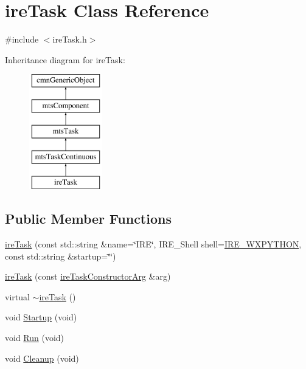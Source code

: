 \hypertarget{classire_task}{\section{ire\-Task Class Reference}
\label{classire_task}
}


{\ttfamily \#include $<$ire\-Task.\-h$>$}

Inheritance diagram for ire\-Task\-:\begin{figure}[H]
\begin{center}
\leavevmode
\includegraphics[height=5.000000cm]{d7/dd4/classire_task}
\end{center}
\end{figure}
\subsection*{Public Member Functions}
\begin{DoxyCompactItemize}
\item 
\hyperlink{classire_task_ade2dbb844ec030116011fef2d691fdd9}{ire\-Task} (const std\-::string \&name=\char`\"{}I\-R\-E\char`\"{}, I\-R\-E\-\_\-\-Shell shell=\hyperlink{ire_task_8h_acf351b6707399f614eed953a7c0c0d9aa659bffb40eea456bffe6e139d3d15477}{I\-R\-E\-\_\-\-W\-X\-P\-Y\-T\-H\-O\-N}, const std\-::string \&startup=\char`\"{}\char`\"{})
\item 
\hyperlink{classire_task_a94437d6aa990db9b83e6741939fbdeee}{ire\-Task} (const \hyperlink{classire_task_constructor_arg}{ire\-Task\-Constructor\-Arg} \&arg)
\item 
virtual \hyperlink{classire_task_aa104e5d7e21103122148fc23d33a0e5b}{$\sim$ire\-Task} ()
\item 
void \hyperlink{classire_task_a9f756fb7c148dada3054fcd5c24ff977}{Startup} (void)
\item 
void \hyperlink{classire_task_aa800f1928e669ace4ce6b7bda8611e59}{Run} (void)
\item 
void \hyperlink{classire_task_a11cb9740fc80625321092ffa9da5811f}{Cleanup} (void)
\end{DoxyCompactItemize}
